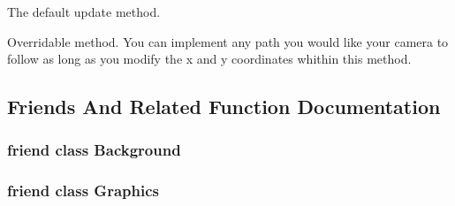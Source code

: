The default update method. 

Overridable method. You can implement any path you would like your camera to follow as long as you modify the x and y coordinates whithin this method. 

\subsection{Friends And Related Function Documentation}
\hypertarget{class_camera_ad70dac188b152e81b4323bb274bee959}{
\subsubsection[{Background}]{\setlength{\rightskip}{0pt plus 5cm}friend class {\bf Background}\hspace{0.3cm}{\ttfamily [friend]}}}\label{class_camera_ad70dac188b152e81b4323bb274bee959}
\hypertarget{class_camera_ae5cfe0c0e0b06d536d5814bd1ff4818f}{
\subsubsection[{Graphics}]{\setlength{\rightskip}{0pt plus 5cm}friend class {\bf Graphics}\hspace{0.3cm}{\ttfamily [friend]}}}\label{class_camera_ae5cfe0c0e0b06d536d5814bd1ff4818f}


